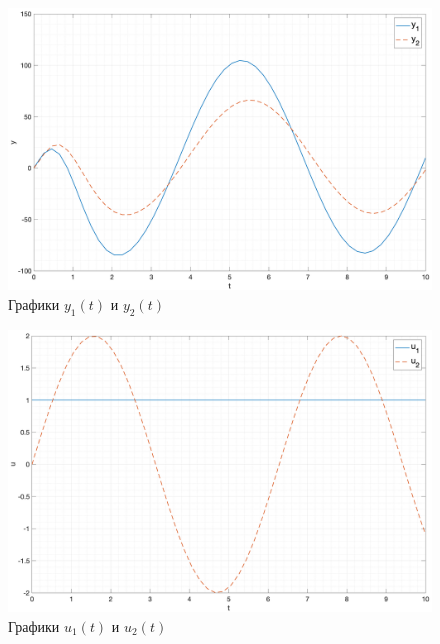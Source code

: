 \begin{figure}[ht!]
    \centering
    \includegraphics[width=\textwidth]{media/sys6_y(t).png}
    \caption{Графики $y_1(t)$ и $y_2(t)$}
    \label{fig:yt6}
\end{figure}

\begin{figure}[ht!]
    \centering
    \includegraphics[width=\textwidth]{media/sys6_u(t).png}
    \caption{Графики $u_1(t)$ и $u_2(t)$}
    \label{fig:ut6}
\end{figure}